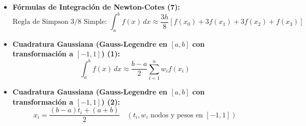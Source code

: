 \documentclass[11pt,a4paper]{article}
\begin{document}
\begin{itemize}
\[\begin{aligned}
    \end{aligned}
  \]
  \item \textbf{Fórmulas de Integración de Newton-Cotes (7):}
  \[
    \text{Regla de Simpson } 3/8 \text{ Simple: } \int_a^b f(x) \, dx \approx \frac{3h}{8}[f(x_0) + 3f(x_1) + 3f(x_2) + f(x_3)]
  \]
  \item \textbf{Cuadratura Gaussiana (Gauss-Legendre en $[a, b]$ con transformación a $[-1, 1]$) (1):}
  \[
    \int_a^b f(x) \, dx \approx \frac{b - a}{2} \sum_{i=1}^n w_i f(x_i)
  \]
  \item \textbf{Cuadratura Gaussiana (Gauss-Legendre en $[a, b]$ con transformación a $[-1, 1]$) (2):}
  \[
    x_i = \frac{(b - a)t_i + (a + b)}{2} \quad (t_i, w_i \text{ nodos y pesos en } [-1, 1])
  \]
\end{itemize}
\end{document}

